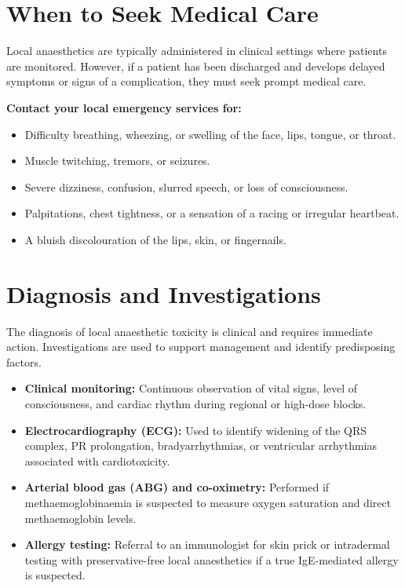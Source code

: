 \section*{When to Seek Medical Care}
Local anaesthetics are typically administered in clinical settings where patients are monitored. However, if a patient has been discharged and develops delayed symptoms or signs of a complication, they must seek prompt medical care.

\textbf{Contact your local emergency services for:}
\begin{itemize}
    \item Difficulty breathing, wheezing, or swelling of the face, lips, tongue, or throat.
    \item Muscle twitching, tremors, or seizures.
    \item Severe dizziness, confusion, slurred speech, or loss of consciousness.
    \item Palpitations, chest tightness, or a sensation of a racing or irregular heartbeat.
    \item A bluish discolouration of the lips, skin, or fingernails.
\end{itemize}

\section*{Diagnosis and Investigations}
The diagnosis of local anaesthetic toxicity is clinical and requires immediate action. Investigations are used to support management and identify predisposing factors.

\begin{itemize}
    \item \textbf{Clinical monitoring:} Continuous observation of vital signs, level of consciousness, and cardiac rhythm during regional or high-dose blocks.
    \item \textbf{Electrocardiography (ECG):} Used to identify widening of the QRS complex, PR prolongation, bradyarrhythmias, or ventricular arrhythmias associated with cardiotoxicity.
    \item \textbf{Arterial blood gas (ABG) and co-oximetry:} Performed if methaemoglobinaemia is suspected to measure oxygen saturation and direct methaemoglobin levels.
    \item \textbf{Allergy testing:} Referral to an immunologist for skin prick or intradermal testing with preservative-free local anaesthetics if a true IgE-mediated allergy is suspected.
\end{itemize}

